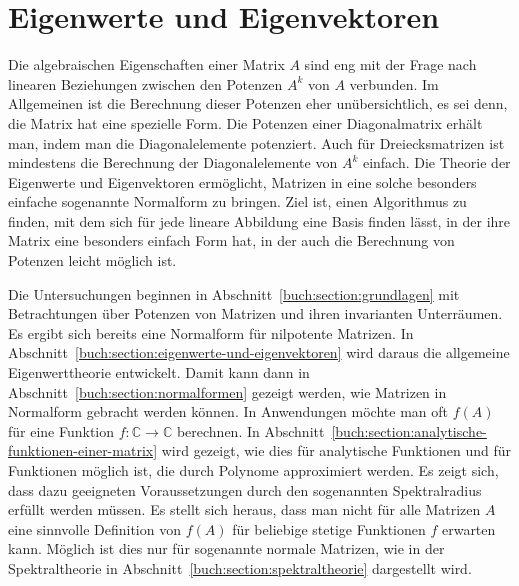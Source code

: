 %
%
%
\chapter{Eigenwerte und Eigenvektoren
\label{buch:chapter:eigenwerte-und-eigenvektoren}}
\rhead{}
Die algebraischen Eigenschaften einer Matrix $A$ sind eng mit der
Frage nach linearen Beziehungen zwischen den Potenzen $A^k$ von $A$ verbunden.
Im Allgemeinen ist die Berechnung dieser Potenzen eher unübersichtlich,
es sei denn, die Matrix hat eine spezielle Form.
Die Potenzen einer Diagonalmatrix erhält man, indem man die Diagonalelemente
potenziert.
%
Auch für Dreiecksmatrizen ist mindestens die Berechnung der Diagonalelemente
von $A^k$ einfach.
%
Die Theorie der Eigenwerte und Eigenvektoren ermöglicht, Matrizen in
%
eine solche besonders einfache sogenannte Normalform zu bringen.
%
Ziel ist, einen Algorithmus zu finden, mit dem sich für jede lineare
Abbildung eine Basis finden lässt, in der ihre Matrix eine besonders
einfach Form hat, in der auch die Berechnung von Potenzen leicht
möglich ist.

Die Untersuchungen beginnen in
Abschnitt~\ref{buch:section:grundlagen} mit Betrachtungen über
Potenzen von Matrizen und ihren invarianten Unterräumen.
%
%
%
Es ergibt sich bereits eine Normalform für nilpotente Matrizen.
%
In Abschnitt~\ref{buch:section:eigenwerte-und-eigenvektoren} wird daraus die
allgemeine Eigenwerttheorie entwickelt.
Damit kann dann in Abschnitt~\ref{buch:section:normalformen}
gezeigt werden, wie Matrizen in Normalform gebracht werden können.
In Anwendungen möchte man oft $f(A)$ 
für eine Funktion $f\colon \mathbb{C}\to\mathbb{C}$ berechnen.
In Abschnitt~\ref{buch:section:analytische-funktionen-einer-matrix} wird
gezeigt, wie dies für analytische Funktionen und für Funktionen möglich
%
ist, die durch Polynome approximiert werden.
Es zeigt sich, dass dazu geeigneten Voraussetzungen durch den sogenannten
Spektralradius erfüllt werden müssen.
%
Es stellt sich heraus, dass man nicht für alle Matrizen $A$ eine 
sinnvolle Definition von $f(A)$ für beliebige stetige Funktionen $f$
erwarten kann.
Möglich ist dies nur für sogenannte normale Matrizen, wie in
der Spektraltheorie in
Abschnitt~\ref{buch:section:spektraltheorie} dargestellt wird.


